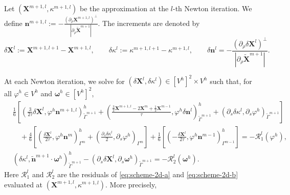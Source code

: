 \documentclass[smallextended]{svjour3}
\numberwithin{equation}{section}
\begin{document}
	Let
	$ (\mathbf{X}^{m+1,l},\kappa^{m+1,l})$
	be the approximation at the $l$-th Newton iteration. We define
	$
	\mathbf{n}^{m+1,l}
	:=
	-\frac{(\partial_\rho\mathbf{X}^{m+1,l})^\perp}
	{|\partial_\rho\widetilde{\mathbf{X}}^{m+1}|}.
	$
	The increments are denoted by
	\[
	\delta\mathbf{X}^{l}
	:=
	\mathbf{X}^{m+1,l+1}-\mathbf{X}^{m+1,l},
	\qquad
	\delta\kappa^{l}
	:=
	\kappa^{m+1,l+1}-\kappa^{m+1,l},
	\qquad
	\delta\mathbf{n}^{l}
	=
	-\frac{(\partial_\rho\delta\mathbf{X}^{l})^\perp}
	{|\partial_\rho\widetilde{\mathbf{X}}^{m+1}|}.
	\]
	
	
	At each Newton iteration, we solve for
	$(\delta\mathbf{X}^{l},\delta\kappa^{l})\in [V^h]^2\times V^h$
	such that, for all $\varphi^h\in V^h$ and $\boldsymbol{\omega}^h\in[V^h]^2$,
	\begin{subequations}
		\label{eq:newton-2d}
		\begin{align}
			&
			\frac16
			\left[
			\left(
			\frac{3}{2\tau}\delta\mathbf{X}^{l},
			\varphi^h\mathbf{n}^{m+1,l}
			\right)^h_{\widetilde{\Gamma}^{m+1}}
			+
			\left(
			\frac{\frac32\mathbf{X}^{m+1,l}-2\mathbf{X}^{m}+\frac12\mathbf{X}^{m-1}}{\tau},
			\varphi^h\delta\mathbf{n}^{l}
			\right)^h_{\widetilde{\Gamma}^{m+1}}
			+
			\left(
			\partial_s\delta\kappa^{l},
			\partial_s\varphi^h
			\right)_{\widetilde{\Gamma}^{m+1}}
			\right]
			\nonumber\\
			&\quad
			+\frac46
			\left[
			\left(
			\frac{\delta\mathbf{X}^{l}}{2\tau},
			\varphi^h\mathbf{n}^{m}
			\right)^h_{\Gamma^{m}}
			+
			\left(
			\frac{\partial_s\delta\kappa^{l}}{2},
			\partial_s\varphi^h
			\right)_{\Gamma^{m}}
			\right]
			+\frac16
			\left[
			\left(
			-\frac{\delta\mathbf{X}^{l}}{2\tau},
			\varphi^h\mathbf{n}^{m-1}
			\right)^h_{\Gamma^{m-1}}
			\right]
			=
			-\mathcal{R}_1^{l}(\varphi^h),
			\label{eq:newton-2d-a}
			\\
			&
			\left(
			\delta\kappa^{l},
			\widetilde{\mathbf{n}}^{m+1}\cdot\boldsymbol{\omega}^h
			\right)^h_{\widetilde{\Gamma}^{m+1}}
			-
			\left(
			\partial_s\delta\mathbf{X}^{l},
			\partial_s\boldsymbol{\omega}^h
			\right)_{\widetilde{\Gamma}^{m+1}}
			=
			-\mathcal{R}_2^{l}(\boldsymbol{\omega}^h).
			\label{eq:newton-2d-b}
		\end{align}
	\end{subequations}
	Here $\mathcal{R}_1^l$ and $\mathcal{R}_2^l$ are the residuals of \eqref{eq:scheme-2d-a} and \eqref{eq:scheme-2d-b} evaluated at 
	$(\mathbf{X}^{m+1,l},\kappa^{m+1,l})$. More precisely,
\end{document}

